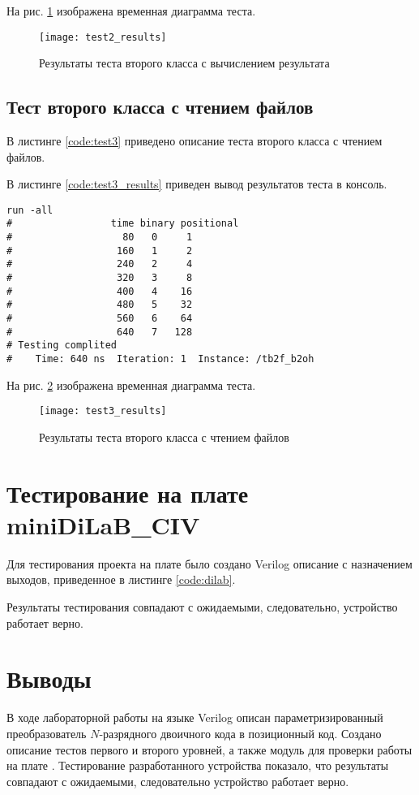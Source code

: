 На рис. \ref{fig:test2_results} изображена временная диаграмма теста.
\begin{figure}[H]
	\begin{center}
		\texttt{[image: test2\_results]}
		\caption{Результаты теста второго класса с вычислением результата}
		\label{fig:test2_results}
	\end{center}
\end{figure}

\subsection{Тест второго класса с чтением файлов}

В листинге \ref{code:test3} приведено описание теста второго класса с чтением файлов.


В листинге \ref{code:test3_results} приведен вывод результатов теста в консоль.
\begin{lstlisting}[caption=Результаты теста второго класса с чтением файлов, label=code:test3_results, language={}]
run -all
# 		          time binary positional
#                   80   0     1
#                  160   1     2
#                  240   2     4
#                  320   3     8
#                  400   4    16
#                  480   5    32
#                  560   6    64
#                  640   7   128
# Testing complited
#    Time: 640 ns  Iteration: 1  Instance: /tb2f_b2oh
\end{lstlisting}

На рис. \ref{fig:test3_results} изображена временная диаграмма теста.
\begin{figure}[H]
	\begin{center}
		\texttt{[image: test3\_results]}
		\caption{Результаты теста второго класса с чтением файлов}
		\label{fig:test3_results}
	\end{center}
\end{figure}

\section{Тестирование на плате miniDiLaB\_CIV}

Для тестирования проекта на плате было создано Verilog описание с назначением выходов, приведенное в листинге  \ref{code:dilab}.


Результаты тестирования совпадают с ожидаемыми, следовательно, устройство работает верно.
 
\section{Выводы}

В ходе лабораторной работы на языке Verilog описан параметризированный преобразователь $N$-разрядного двоичного кода в позиционный код. Создано описание тестов первого и второго уровней, а также модуль для проверки работы на плате . Тестирование разработанного устройства показало, что результаты совпадают с ожидаемыми, следовательно устройство работает верно.

